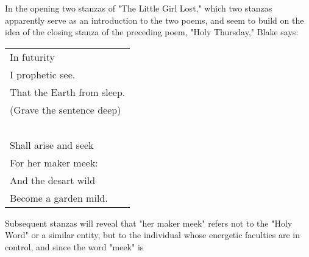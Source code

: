 \vspace*{0.5\baselineskip}
In the opening two stanzas of "The Little Girl Lost," which two stanzas apparently serve as an
introduction to the two poems, and seem to build on the idea of the closing stanza of the preceding poem,
"Holy Thursday," Blake says:\par
\begin{center}
	\begin{tabular}{l}
		In futurity                \\
		I prophetic see.           \\
		That the Earth from sleep. \\
		(Grave the sentence deep)  \\
		~                          \\
		Shall arise and seek       \\
		For her maker meek:        \\
		And the desart wild        \\
		Become a garden mild.
	\end{tabular}
\end{center}
\hspace*{5mm}Subsequent stanzas will reveal that "her maker meek" refers not to the "Holy Word" or a similar
entity, but to the individual whose energetic faculties are in control, and since the word "meek" is\linebreak
\null\par
\vspace*{-\baselineskip}

\newpage

